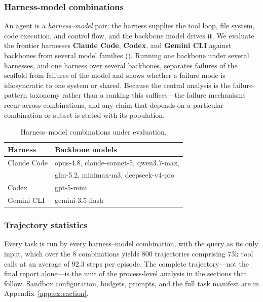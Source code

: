 \subsubsection{Harness-model combinations}
\label{sec:setup:agents}
An agent is a \emph{harness--model} pair: the harness supplies the tool loop, file system, code
execution, and control flow, and the backbone model drives it. We evaluate the frontier harnesses
\textbf{Claude Code}, \textbf{Codex}, and \textbf{Gemini CLI} against backbones from several model
families (). Running one backbone under several harnesses, and one harness
over several backbones, separates failures of the scaffold from failures of the model and shows
whether a failure mode is idiosyncratic to one system or shared. Because the central analysis is the
failure-pattern taxonomy rather than a ranking this suffices---the failure mechanisms recur across
combinations, and any claim that depends on a particular combination or subset is stated with its
population.

\begin{table}[t]
\centering\small
\caption{Harness--model combinations under evaluation.}
\label{tab:harness-model}
\begin{tabular}{@{}ll@{}}
\toprule
\textbf{Harness} & \textbf{Backbone models} \\
\midrule
Claude Code & opus-4.8, claude-sonnet-5, qwen3.7-max, \\
            & glm-5.2, minimax-m3, deepseek-v4-pro \\
Codex       & gpt-5-mini \\
Gemini CLI  & gemini-3.5-flash \\
\bottomrule
\end{tabular}
\end{table}

\subsubsection{Trajectory statistics}
\label{sec:setup:rollout}
Every task is run by every harness--model combination, with the query as its only input, which
over the $8$ combinations yields $800$ trajectories comprising
$73$k tool calls at an average of $92.3$ steps per episode. The complete trajectory---not the
final report alone---is the unit of the process-level analysis in the sections that follow.
Sandbox configuration, budgets, prompts, and the full task manifest are in
Appendix~\ref{app:extraction}.